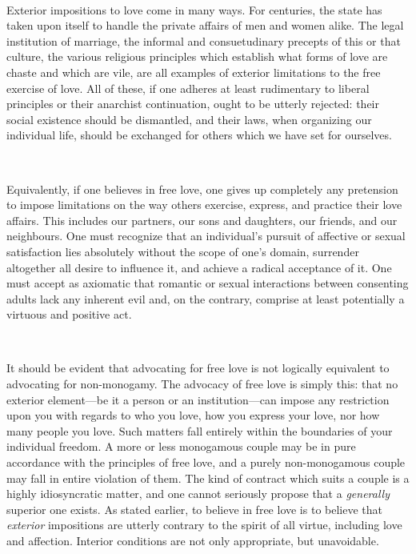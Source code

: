 \documentclass[a4paper, 12pt]{article}
\begin{document}
~ 

Exterior impositions to love come in many ways. For centuries, the state has
taken upon itself to handle the private affairs of men and women alike. The
legal institution of marriage, the informal and consuetudinary precepts of this
or that culture, the various religious principles which establish what forms
of love are chaste and which are vile, are all examples of exterior limitations
to the free exercise of love. All of these, if one adheres at least rudimentary
to liberal principles or their anarchist continuation, ought to be utterly
rejected: their social existence should be dismantled, and their laws, when
organizing our individual life, should be exchanged for others which we have
set for ourselves.

~

Equivalently, if one believes in free love, one gives up completely any
pretension to impose limitations on the way others exercise, express, and
practice their love affairs. This includes our partners, our sons and
daughters, our friends, and our neighbours. One must recognize that an
individual's pursuit of affective or sexual satisfaction lies absolutely
without the scope of one's domain, surrender altogether all desire to influence
it, and achieve a radical acceptance of it. One must accept as axiomatic that 
romantic or sexual interactions between consenting adults lack any inherent evil
and, on the contrary, comprise at least potentially a virtuous and positive act.

~

It should be evident that advocating for free love is not logically equivalent
to advocating for non-monogamy. The advocacy of free love is simply this: that
no exterior element---be it a person or an institution---can impose any
restriction upon you with regards to who you love, how you express your love,
nor how many people you love. Such matters fall entirely within the boundaries
of your individual freedom. A more or less monogamous couple may be in pure
accordance with the principles of free love, and a purely non-monogamous couple may
fall in entire violation of them. The kind of contract which suits a couple is
a highly idiosyncratic matter, and one cannot seriously propose that a
\textit{generally} superior one exists. As stated earlier, to believe in free
love is to believe that \textit{exterior} impositions are utterly contrary to
the spirit of all virtue, including love and affection. Interior conditions
are not only appropriate, but unavoidable.
\end{document}
